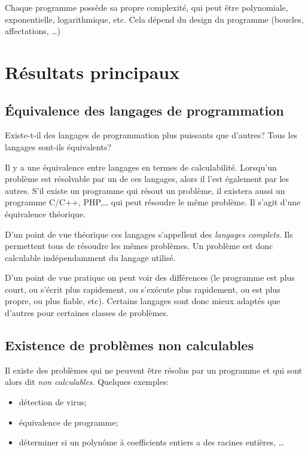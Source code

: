 Chaque programme possède sa propre complexité, qui peut être polynomiale, exponentielle, logarithmique, etc. Cela dépend du design du programme (boucles, affectations, \ldots)



\section{Résultats principaux}
\label{sec:r_sultat_principaux}

\subsection{Équivalence des langages de programmation}
\label{subsec:equivalence_des_langages_de_programmation}

Existe-t-il des langages de programmation plus puissants que d'autres? Tous les langages sont-ils équivalents?

Il y a une équivalence entre langages en termes de calculabilité.  Lorsqu'un problème est résolvable par un de ces langages, alors il l'est également par les autres.
S'il existe un programme \java qui résout un problème, il existera aussi un programme C/C++, PHP,\ldots{} qui peut résoudre le même problème. Il s'agit d'une équivalence théorique.

D'un point de vue théorique ces langages s'appellent des \emph{langages complets}. Ils permettent tous de résoudre les mêmes problèmes. Un problème est donc calculable indépendamment du langage utilisé.

D'un point de vue pratique on peut voir des différences (le programme est plus court, ou s'écrit plus rapidement, ou s'exécute plus rapidement, ou est plus propre, ou plus fiable, etc). Certains langages sont donc mieux adaptés que d'autres pour certaines classes de problèmes.


\subsection{Existence de problèmes non calculables}
\label{subsec:existence_de_problemes_non_calculables}
	Il existe des problèmes qui ne peuvent être résolus par un programme et qui sont alors dit \emph{non calculables}.
	Quelques exemples:
	\begin{itemize}
		\item détection de virus;
		\item équivalence de programme;
		\item déterminer si un polynôme à coefficients entiers a des racines entières, \ldots
	\end{itemize}

